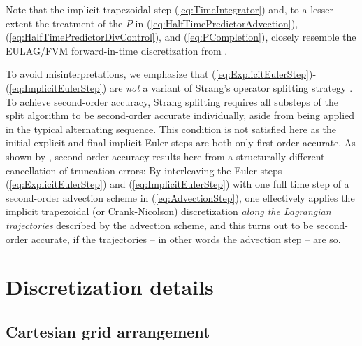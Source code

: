 \documentclass{ametsoc}
\theoremstyle{definition}
\newcommand{\eq}[1]{(\ref{#1})}
\begin{document}
Note that the implicit trapezoidal step \eq{eq:TimeIntegrator} and, to a 
lesser extent the treatment of the $P$ in \eq{eq:HalfTimePredictorAdvection}, 
\eq{eq:HalfTimePredictorDivControl}, and \eq{eq:PCompletion}, closely resemble the EULAG/FVM forward-in-time discretization from 
\citet{SmolarkiewiczMargolin1997,PrusaEtAl2008,SmolarkiewiczEtAl2014,SmolarkiewiczEtAl2016, KuehnleinEtAl2019}. 

To avoid misinterpretations, we emphasize that 
\eq{eq:ExplicitEulerStep}-\eq{eq:ImplicitEulerStep} are \emph{not} a
variant of Strang's operator splitting strategy \citep{Strang1968}. To
achieve second-order accuracy, Strang splitting requires all substeps of 
the split algorithm to be second-order accurate individually, aside from
being applied in the typical alternating sequence. This condition is not 
satisfied here as the initial explicit and final implicit Euler steps are 
both only first-order accurate. As shown by \citet{SmolarkiewiczMargolin1993}, 
second-order accuracy results here from a structurally different cancellation 
of truncation errors: By interleaving the Euler steps \eq{eq:ExplicitEulerStep} 
and \eq{eq:ImplicitEulerStep} with one full time step of a second-order 
advection scheme in \eq{eq:AdvectionStep}, one effectively applies the
implicit trapezoidal (or Crank-Nicolson) discretization 
\emph{along the Lagrangian trajectories} described by the advection scheme, 
and this turns out to be second-order accurate, if the trajectories -- in other 
words the advection step -- are so. 




\section{Discretization details}
\label{sec:DiscretizationDetails}


\subsection{Cartesian grid arrangement}
\label{ssec:GridArrangement}
\end{document}
